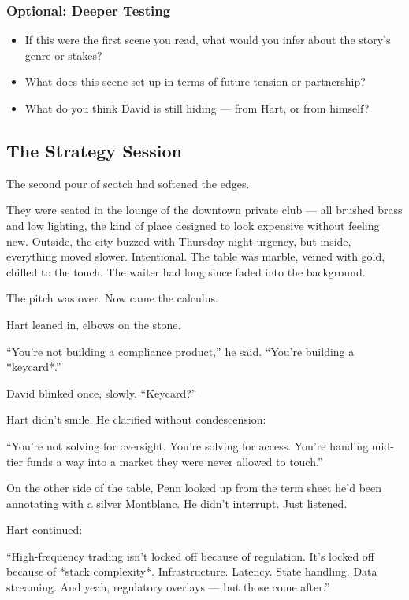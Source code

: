 \subsubsection{Optional: Deeper Testing}

\begin{itemize}
  \item If this were the first scene you read, what would you infer about the story’s genre or stakes?
  \item What does this scene set up in terms of future tension or partnership?
  \item What do you think David is still hiding — from Hart, or from himself?
\end{itemize}



\subsection{The Strategy Session}

The second pour of scotch had softened the edges.

They were seated in the lounge of the downtown private club — all brushed brass and low lighting, the kind of place 
designed to look expensive without feeling new. Outside, the city buzzed with Thursday night urgency, but inside, 
everything moved slower. Intentional. The table was marble, veined with gold, chilled to the touch. The waiter had 
long since faded into the background.

The pitch was over. Now came the calculus.

Hart leaned in, elbows on the stone.

“You’re not building a compliance product,” he said. “You’re building a *keycard*.”

David blinked once, slowly. “Keycard?”

Hart didn’t smile. He clarified without condescension:

“You’re not solving for oversight. You’re solving for access. You’re handing mid-tier funds a way into a market they were 
never allowed to touch.”

On the other side of the table, Penn looked up from the term sheet he’d been annotating with a silver Montblanc. He didn’t 
interrupt. Just listened.

Hart continued:

“High-frequency trading isn’t locked off because of regulation. It’s locked off because of *stack complexity*. 
Infrastructure. Latency. State handling. Data streaming. And yeah, regulatory overlays — but those come after.”

